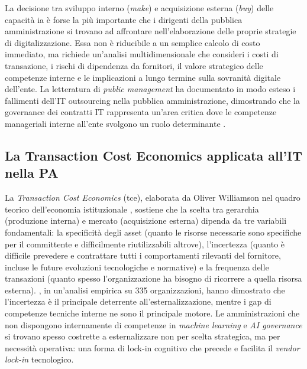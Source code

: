 La decisione tra sviluppo interno (\textit{make}) e acquisizione esterna (\textit{buy}) delle capacità \gls{ia} è forse la più importante che i dirigenti della pubblica amministrazione si trovano ad affrontare nell'elaborazione delle proprie strategie di digitalizzazione. Essa non è riducibile a un semplice calcolo di costo immediato, ma richiede un'analisi multidimensionale che consideri i costi di transazione, i rischi di dipendenza da fornitori, il valore strategico delle competenze interne e le implicazioni a lungo termine sulla sovranità digitale dell'ente. La letteratura di \textit{public management} ha documentato in modo esteso i fallimenti dell'IT outsourcing nella pubblica amministrazione, dimostrando che la governance dei contratti IT rappresenta un'area critica dove le competenze manageriali interne all'ente svolgono un ruolo determinante \parencite{Cordella2010}.

\subsection{La Transaction Cost Economics applicata all'IT nella PA}

La \textit{Transaction Cost Economics} (\gls{tce}), elaborata da Oliver Williamson nel quadro teorico dell'economia istituzionale \parencite{Williamson1985}, sostiene che la scelta tra gerarchia (produzione interna) e mercato (acquisizione esterna) dipenda da tre variabili fondamentali: la specificità degli asset (quanto le risorse necessarie sono specifiche per il committente e difficilmente riutilizzabili altrove), l'incertezza (quanto è difficile prevedere e contrattare tutti i comportamenti rilevanti del fornitore, incluse le future evoluzioni tecnologiche e normative) e la frequenza delle transazioni (quanto spesso l'organizzazione ha bisogno di ricorrere a quella risorsa esterna). \textcite{Aubert2004}, in un'analisi empirica su 335 organizzazioni, hanno dimostrato che l'incertezza è il principale deterrente all'esternalizzazione, mentre i gap di competenze tecniche interne ne sono il principale motore. Le amministrazioni che non dispongono internamente di competenze in \textit{machine learning} e \textit{AI governance} si trovano spesso costrette a esternalizzare non per scelta strategica, ma per necessità operativa: una forma di lock-in cognitivo che precede e facilita il \textit{vendor lock-in} tecnologico.

